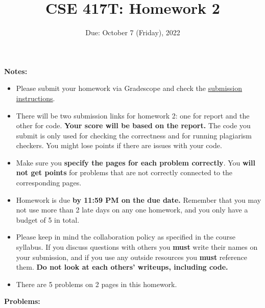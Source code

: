 \documentclass[11pt]{article}
\begin{document}
\title{CSE 417T: Homework 2}
\date{Due: October 7 (Friday), 2022}

\maketitle

\noindent \textbf{Notes: } 
\begin{itemize}

\item Please submit your homework via Gradescope and check the \href{http://chienjuho.com/courses/cse417t/hw_instructions.html}{\underline{submission instructions}}.

\item There will be two submission links for homework 2: one for report and the other for code. \textbf{Your score will be based on the report.} The code you submit is only used for checking the correctness and for running plagiarism checkers. You might lose points if there are issues with your code.

\item Make sure you \textbf{specify the pages for each problem correctly}. You \textbf{will not get points} for problems that are not correctly connected to the corresponding pages.

\item Homework is due \textbf{by 11:59 PM on the due date.} Remember that
  you may not use more than 2 late days on any one homework, and you
  only have a budget of 5 in total.

\item Please keep in mind the collaboration policy as specified in the
  course syllabus. If you discuss questions with 
others you \textbf{must} write their names on your submission, and if
you use any outside resources you \textbf{must} reference
them. \textbf{Do not look at each others' writeups, including code.}

\item There are 5 problems on 2 pages in this homework. 

\end{itemize}

\noindent \textbf{Problems:}
\end{document}
